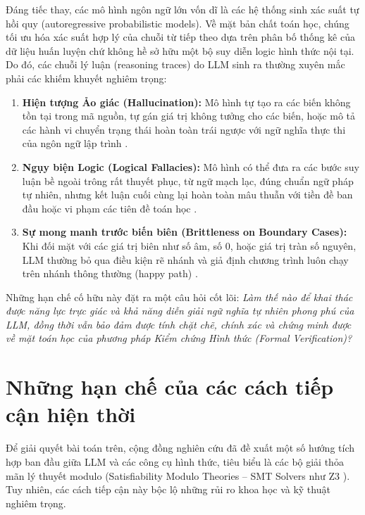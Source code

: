 Đáng tiếc thay, các mô hình ngôn ngữ lớn vốn dĩ là các hệ thống sinh xác suất tự hồi quy (autoregressive probabilistic models). Về mặt bản chất toán học, chúng tối ưu hóa xác suất hợp lý của chuỗi từ tiếp theo dựa trên phân bố thống kê của dữ liệu huấn luyện chứ không hề sở hữu một bộ suy diễn logic hình thức nội tại. Do đó, các chuỗi lý luận (reasoning traces) do LLM sinh ra thường xuyên mắc phải các khiếm khuyết nghiêm trọng:
\begin{enumerate}
    \item \textbf{Hiện tượng Ảo giác (Hallucination):} Mô hình tự tạo ra các biến không tồn tại trong mã nguồn, tự gán giá trị không tưởng cho các biến, hoặc mô tả các hành vi chuyển trạng thái hoàn toàn trái ngược với ngữ nghĩa thực thi của ngôn ngữ lập trình \cite{lyu2023faithful}.
    \item \textbf{Ngụy biện Logic (Logical Fallacies):} Mô hình có thể đưa ra các bước suy luận bề ngoài trông rất thuyết phục, từ ngữ mạch lạc, đúng chuẩn ngữ pháp tự nhiên, nhưng kết luận cuối cùng lại hoàn toàn mâu thuẫn với tiền đề ban đầu hoặc vi phạm các tiên đề toán học \cite{ling2023deductive}.
    \item \textbf{Sự mong manh trước biến biên (Brittleness on Boundary Cases):} Khi đối mặt với các giá trị biên như số âm, số 0, hoặc giá trị tràn số nguyên, LLM thường bỏ qua điều kiện rẽ nhánh và giả định chương trình luôn chạy trên nhánh thông thường (happy path) \cite{thakur2026think}.
\end{enumerate}

Những hạn chế cố hữu này đặt ra một câu hỏi cốt lõi: \textit{Làm thế nào để khai thác được năng lực trực giác và khả năng diễn giải ngữ nghĩa tự nhiên phong phú của LLM, đồng thời vẫn bảo đảm được tính chặt chẽ, chính xác và chứng minh được về mặt toán học của phương pháp Kiểm chứng Hình thức (Formal Verification)?}

\section{Những hạn chế của các cách tiếp cận hiện thời}
\label{sec:limitations_existing_approaches}
Để giải quyết bài toán trên, cộng đồng nghiên cứu đã đề xuất một số hướng tích hợp ban đầu giữa LLM và các công cụ hình thức, tiêu biểu là các bộ giải thỏa mãn lý thuyết modulo (Satisfiability Modulo Theories -- SMT Solvers như Z3 \cite{moura2008z3}). Tuy nhiên, các cách tiếp cận này bộc lộ những rủi ro khoa học và kỹ thuật nghiêm trọng.

